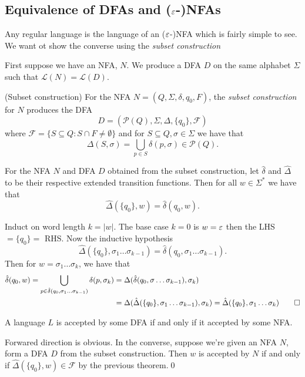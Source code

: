 \documentclass[tikx, border = 10pt]{article}
\begin{document}
\subsection{Equivalence of DFAs and ($ \varepsilon $-)NFAs}
Any regular language is the language of an ($ \varepsilon $-)NFA which is fairly simple to see. We want ot show the converse using the \textit{subset construction}
\par
First suppose we have an NFA, $ N $. We produce a DFA $ D $ on the same alphabet $ \Sigma $ such that $ \mathcal L (N) = \mathcal L (D) $.
\begin{definition}
	(Subset construction) For the NFA $ N = (Q,\Sigma, \delta, q_0, F) $, the \textit{subset construction} for $ N $ produces the DFA 
	\[
		D = (\mathcal P(Q), \Sigma, \Delta, \{q_0\}, \mathcal F)
	\]
	where $ \mathcal F = \{ S \subseteq Q : S \cap F \ne \emptyset \} $ and for $ S\subseteq Q, \sigma \in \Sigma $ we have that
	\[
		\Delta(S, \sigma) = \bigcup_{p\in S} \delta(p,\sigma) \in \mathcal P(Q).
	\]
\end{definition}
\begin{theorem}
	For the NFA $ N $ and DFA $ D $ obtained from the subset construction, let $ \hat \delta $ and $ \hat \Delta $ to be their respective extended transition functions. Then for all $ w\in \Sigma^* $ we have that
	\[
		\hat \Delta(\{q_0\}, w) = \hat \delta(q_0,w).
	\]
\end{theorem}
\pf Induct on word length $ k  = | w | $. The base case $ k = 0 $ is $ w = \varepsilon $ then the LHS $ = \{q_0\} = $ RHS. Now the inductive hypothesis
\[
	\hat \Delta (\{q_0\}, \sigma_1\dots \sigma_{k-1}) = \hat\delta( q_0,\sigma_1\dots \sigma_{k-1}).
\]
Then for $ w = \sigma_1\dots \sigma_k $, we have that
\begin{align*}
	\hat \delta(q_0,w) = \bigcup_{p\in \hat\delta(q_0,\sigma_1\dots \sigma_{k-1})} \delta(p,\sigma_k) &= \Delta(\hat\delta(q_0,\sigma\dots \sigma_{k-1}),\sigma_k) \\
													  &= \Delta(\hat \Delta(\{q_0\}, \sigma_1\dots \sigma_{k-1}),\sigma_k) = \hat\Delta(\{q_0\}, \sigma_1\dots \sigma_k)\qed\\
\end{align*}
\begin{corollary}
  A language $ L $ is accepted by some DFA if and only if it accepted by some NFA.
\end{corollary}
\pf Forwared direction is obvious. In the converse, suppose we're given an NFA $ N $, form a DFA $ D $ from the subset construction. Then $ w $ is accepted by $ N $ if and only if $ \hat \Delta(\{q_0\}, w) \in \mathcal F $ by the previous theorem.\qed
\end{document}
